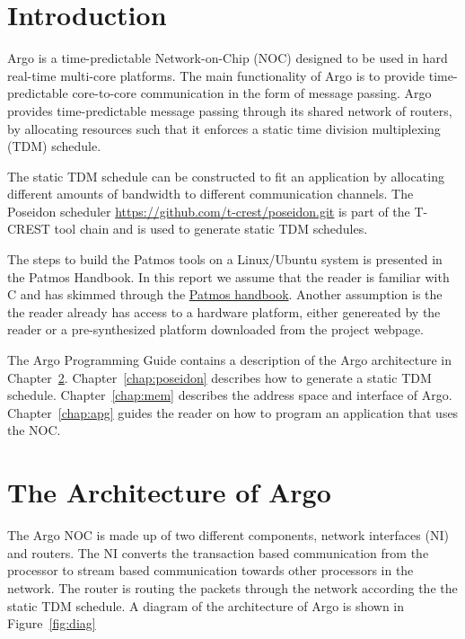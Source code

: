 \documentclass[a4paper,fontsize=10pt,twoside,DIV15,BCOR12mm,headinclude=true,footinclude=false,pagesize,bibtotoc]{scrbook}
\begin{document}
\mainmatter

\chapter{Introduction}

Argo is a time-predictable Network-on-Chip (NOC) designed to be used in hard real-time multi-core platforms.
The main functionality of Argo is to provide time-predictable core-to-core communication in the form of message passing.
Argo provides time-predictable message passing through its shared network of routers,
by allocating resources such that it enforces a static time division multiplexing (TDM) schedule.

The static TDM schedule can be constructed to fit an application by allocating
different amounts of bandwidth to different communication channels.
The Poseidon scheduler \url{https://github.com/t-crest/poseidon.git} is part of
the T-CREST tool chain and is used to generate static TDM schedules.

The steps to build the Patmos tools on a Linux/Ubuntu
system is presented in the Patmos Handbook.
In this report we assume that the reader is familiar with C and has skimmed
through the \href{http://patmos.compute.dtu.dk/patmos_handbook.pdf}{Patmos handbook}.
Another assumption is the the reader already has access to a hardware platform,
either genereated by the reader or a pre-synthesized platform downloaded from the project webpage.

The Argo Programming Guide contains a description of the Argo architecture in Chapter~\ref{chap:arch}.
Chapter~\ref{chap:poseidon} describes how to generate a static TDM schedule.
Chapter~\ref{chap:mem} describes the address space and interface of Argo.
Chapter~\ref{chap:apg} guides the reader on how to program an application that uses the NOC.



\chapter{The Architecture of Argo}
\label{chap:arch}

The Argo NOC is made up of two different components,
network interfaces (NI) and routers.
The NI converts the transaction based communication from the processor to
stream based communication towards other processors in the network.
The router is routing the packets through the network according the the static TDM schedule.
A diagram of the architecture of Argo is shown in Figure~\ref{fig:diag}
\end{document}
